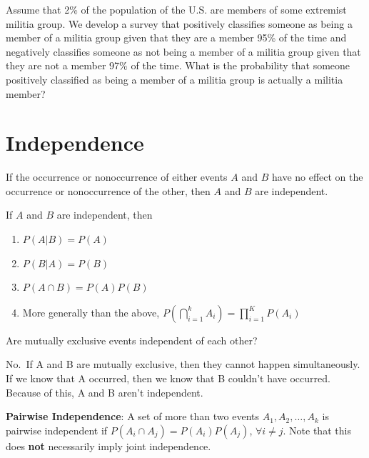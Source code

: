\documentclass[]{book}
\providecommand{\tightlist}{%
  \setlength{\itemsep}{0pt}\setlength{\parskip}{0pt}}
\theoremstyle{definition}
\theoremstyle{definition}
\theoremstyle{definition}
\theoremstyle{remark}
\let\BeginKnitrBlock\begin \let\EndKnitrBlock\end
\begin{document}
\BeginKnitrBlock{exercise}[Conditional Probability]
\protect\hypertarget{exr:condprobexr}{}{\label{exr:condprobexr} {} }

Assume that 2\% of the population of the U.S. are members of some extremist militia group. We develop a survey that positively classifies someone as being a member of a militia group given that they are a member 95\% of the time and negatively classifies someone as not being a member of a militia group given that they are not a member 97\% of the time. What is the probability that someone positively classified as being a member of a militia group is actually a militia member?
\EndKnitrBlock{exercise}

\hypertarget{independence}{%
\section{Independence}\label{independence}}

\BeginKnitrBlock{definition}[Independence]
\protect\hypertarget{def:unnamed-chunk-70}{}{\label{def:unnamed-chunk-70} {} } If the occurrence or nonoccurrence of either events \(A\) and \(B\) have no effect on the occurrence or nonoccurrence of the other, then \(A\) and \(B\) are independent.
\EndKnitrBlock{definition}

If \(A\) and \(B\) are independent, then

\begin{enumerate}
\def\labelenumi{\arabic{enumi}.}
\tightlist
\item
  \(P(A|B)=P(A)\)
\item
  \(P(B|A)=P(B)\)
\item
  \(P(A\cap B)=P(A)P(B)\)
\item
  More generally than the above, \(P(\bigcap_{i=1}^k A_i) = \prod_{i = 1}^K P(A_i)\)
\end{enumerate}

Are mutually exclusive events independent of each other?

No.~If A and B are mutually exclusive, then they cannot happen simultaneously. If we know that A occurred, then we know that B couldn't have occurred. Because of this, A and B aren't independent.

\textbf{Pairwise Independence}: A set of more than two events \(A_1, A_2, \dots, A_k\) is pairwise independent if \(P(A_i\cap A_j)=P(A_i)P(A_j)\), \(\forall i\neq j\). Note that this does \textbf{not} necessarily imply joint independence.
\end{document}
